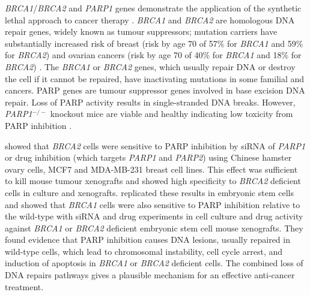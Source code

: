 \textit{BRCA1}/\textit{BRCA2} and \textit{PARP1} genes demonstrate the application of the \gls{synthetic lethal} approach to cancer therapy \citep{Ashworth2008, Kaelin2005}. \textit{BRCA1} and \textit{BRCA2} are homologous \acrshort{DNA} repair genes, widely known as \glspl{tumour suppressor}; \gls{mutation} carriers have substantially increased risk of breast (risk by age 70 of 57\% for \textit{BRCA1} and 59\% for \textit{BRCA2}) and ovarian cancers (risk by age 70 of 40\% for \textit{BRCA1} and 18\% for \textit{BRCA2}) \citep{Chen2007}. The \textit{BRCA1} or \textit{BRCA2} genes, which usually repair \acrshort{DNA} or destroy the cell if it cannot be repaired, have inactivating  \glspl{mutation} in some \gls{familial} and  cancers. \acrfull{PARP} genes are \gls{tumour suppressor} genes involved in base excision \acrshort{DNA} repair. Loss of \gls{PARP} activity results in single-stranded \acrshort{DNA} breaks. However, \textit{PARP1}$^{-/-}$ knockout mice are viable and healthy indicating low toxicity from \gls{PARP} inhibition \citep{Bryant2005}.  

\citet{Bryant2005} showed that \textit{BRCA2} cells were sensitive to \gls{PARP} inhibition by \gls{siRNA} of \textit{PARP1} or drug inhibition (which targets \textit{PARP1} and \textit{PARP2}) using Chinese hamster ovary cells, MCF7 and MDA-MB-231 breast cell lines. This effect was sufficient to kill mouse tumour xenografts and showed high specificity to \textit{BRCA2} deficient cells in culture and xenografts. \citet{Farmer2005} replicated these results in embryonic stem cells and showed that \textit{BRCA1} cells were also sensitive to \gls{PARP} inhibition relative to the \gls{wild-type} with \gls{siRNA} and drug experiments in cell culture and drug activity against \textit{BRCA1} or \textit{BRCA2} deficient embryonic stem cell mouse xenografts. They found evidence that \gls{PARP} inhibition causes \acrshort{DNA} lesions, usually repaired in \gls{wild-type} cells, which lead to chromosomal instability, cell cycle arrest, and induction of apoptosis in \textit{BRCA1} or \textit{BRCA2} deficient cells. The combined loss of \acrshort{DNA} repairs \glspl{pathway} gives a plausible mechanism for an effective anti-cancer treatment.  


